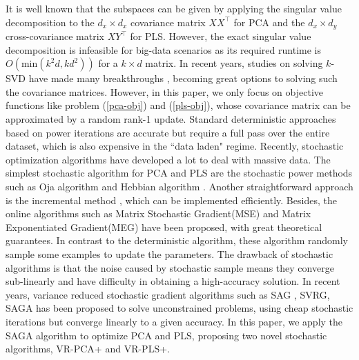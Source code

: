 \documentclass[runningheads,a4paper]{llncs}
\begin{document}
It is well known that the subspaces can be given by applying the singular value decomposition to the $d_x \times d_x$ covariance matrix $XX^\top$ for PCA and the $d_x \times d_y$ cross-covariance matrix $XY^\top$ for PLS. However, the exact singular value decomposition is infeasible for big-data scenarios as its required runtime is $O(\mathrm{min}(k^2d,kd^2))$ for a $k \times d$ matrix.
In recent years, studies on solving $k$-SVD have made many breakthroughs \citep{Bhojanapalli2014Tighter}\citep{Musco2015Randomized}\citep{Halko2010Finding},  becoming great options to solving such the covariance matrices. 
However, in this paper, we only focus on objective functions like problem (\ref{pca-obj}) and (\ref{pls-obj}), whose covariance matrix can be approximated by a random rank-1 update.
Standard deterministic approaches based on power iterations are accurate but require a full pass over the entire dataset, which is also expensive in the ``data laden" regime. Recently, stochastic optimization algorithms have developed a lot to deal with massive data.
The simplest stochastic algorithm for PCA and PLS are the stochastic power methods such as Oja algorithm \citep{Oja1982Simplified} and Hebbian algorithm \citep{Sanger1989Optimal}. Another straightforward approach is the incremental method \citep{Arora2014Stochastic}, which can be implemented efficiently. Besides, the online algorithms such as Matrix Stochastic Gradient(MSE) and Matrix Exponentiated Gradient(MEG) \citep{Arora2016Stochastic}\citep{Arora2013Stochastic} have been proposed, with great theoretical guarantees. In contrast to the deterministic algorithm, these algorithm randomly sample some examples to update the parameters.
The drawback of stochastic algorithms is that the noise caused by stochastic sample means they converge sub-linearly and have difficulty in obtaining a high-accuracy solution. 
In recent years, variance reduced stochastic gradient algorithms such as SAG \citep{Schmidt2013Minimizing}, SVRG\citep{IEEE2013Accelerating}, SAGA \citep{Defazio2014SAGA} has been proposed to solve unconstrained problems, using cheap stochastic iterations but converge linearly to a given accuracy. In this paper, we apply the SAGA algorithm to optimize PCA and PLS, proposing two novel stochastic algorithms, VR-PCA+ and VR-PLS+.
\end{document}

